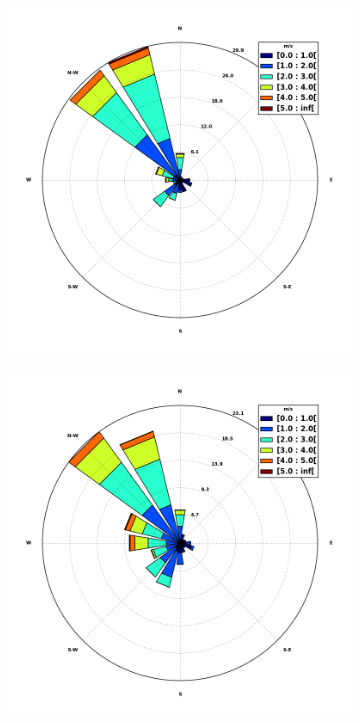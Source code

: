 \documentclass[fontsize=11pt]{scrartcl} %
\begin{document}
\begin{figure}[h!]
	\begin{subfigure}[b]{0.3\textwidth}
		\includegraphics[width=\linewidth]{windrose_Base}
	\end{subfigure}
	\begin{subfigure}[b]{0.3\textwidth}			
		\includegraphics[width=\linewidth]{windrose_Remote}

\end{subfigure}
\end{figure}
\end{document}
